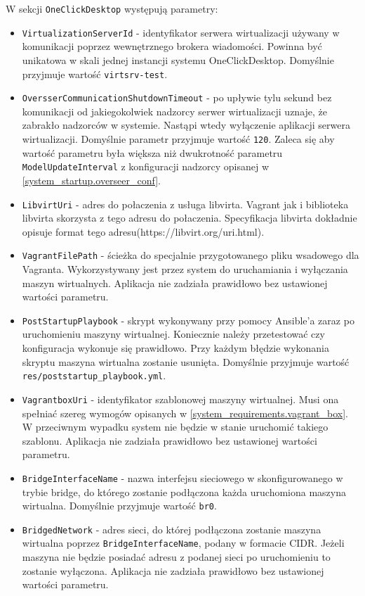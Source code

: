\documentclass[../opis-rozwiazania.tex]{subfiles}
\begin{document}
W sekcji \texttt{OneClickDesktop} występują parametry:
\begin{itemize}
	\item \texttt{VirtualizationServerId} - identyfikator serwera wirtualizacji używany w komunikacji poprzez wewnętrznego brokera wiadomości. Powinna być unikatowa w skali jednej instancji systemu OneClickDesktop. Domyślnie przyjmuje wartość \texttt{virtsrv-test}.
	\item \texttt{OversserCommunicationShutdownTimeout} - po upływie tylu sekund bez komunikacji od jakiegokolwiek nadzorcy serwer wirtualizacji uznaje, że zabrakło nadzorców w systemie. Nastąpi wtedy wyłączenie aplikacji serwera wirtualizacji. Domyślnie parametr przyjmuje wartość \texttt{120}. Zaleca się aby wartość parametru była większa niż dwukrotność parametru \texttt{ModelUpdateInterval} z konfiguracji nadzorcy opisanej w \ref{system_startup.overseer_conf}.
	\item \texttt{LibvirtUri} - adres do połaczenia z usługa libvirta. Vagrant jak i biblioteka libvirta skorzysta z tego adresu do połaczenia. Specyfikacja libvirta dokładnie opisuje format tego adresu(https://libvirt.org/uri.html).
	\item \texttt{VagrantFilePath} - ścieżka do specjalnie przygotowanego pliku wsadowego dla Vagranta. Wykorzystywany jest przez system do uruchamiania i wyłączania maszyn wirtualnych. Aplikacja nie zadziała prawidłowo bez ustawionej wartości parametru.
	\item \texttt{PostStartupPlaybook} - skrypt wykonywany przy pomocy Ansible'a zaraz po uruchomieniu maszyny wirtualnej. Koniecznie należy przetestować czy konfiguracja wykonuje się prawidłowo. Przy każdym błędzie wykonania skryptu maszyna wirtualna zostanie usunięta. Domyślnie przyjmuje wartość \texttt{res/poststartup\_playbook.yml}.
	\item \texttt{VagrantboxUri} - identyfikator szablonowej maszyny wirtualnej. Musi ona spełniać szereg wymogów opisanych w \ref{system_requirements.vagrant_box}. W przeciwnym wypadku system nie będzie w stanie uruchomić takiego szablonu. Aplikacja nie zadziała prawidłowo bez ustawionej wartości parametru.
	\item \texttt{BridgeInterfaceName} - nazwa interfejsu sieciowego w skonfigurowanego w trybie bridge, do którego zostanie podłączona każda uruchomiona maszyna wirtualna. Domyślnie przyjmuje wartość \texttt{br0}.
	\item \texttt{BridgedNetwork} - adres sieci, do której podłączona zostanie maszyna wirtualna poprzez \texttt{BridgeInterfaceName}, podany w formacie CIDR. Jeżeli maszyna nie będzie posiadać adresu z podanej sieci po uruchomieniu to zostanie wyłączona. Aplikacja nie zadziała prawidłowo bez ustawionej wartości parametru.

\end{itemize}
\end{document}
